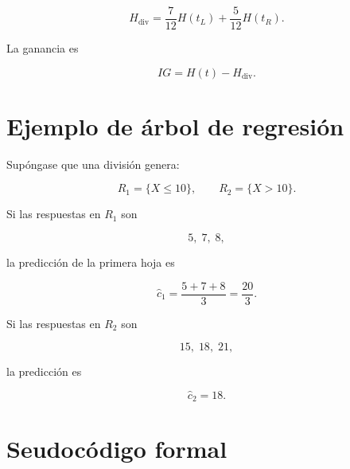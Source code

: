 \documentclass[
  spanish,
  10.5pt,
  letterpaper,
  DIV=11,
  numbers=noendperiod,
  oneside,
  open=any]{scrreprt}
\theoremstyle{definition}
\theoremstyle{definition}
\theoremstyle{plain}
\theoremstyle{remark}
\begin{document}
\[
H_{\text{div}}
=
\frac{7}{12}H(t_L)
+
\frac{5}{12}H(t_R).
\]

La ganancia es

\[
IG=H(t)-H_{\text{div}}.
\]

\section*{Ejemplo de árbol de
regresión}\label{ejemplo-de-uxe1rbol-de-regresiuxf3n}


Supóngase que una división genera:

\[
R_1=\{X\leq 10\},
\qquad
R_2=\{X>10\}.
\]

Si las respuestas en \(R_1\) son

\[
5,\;7,\;8,
\]

la predicción de la primera hoja es

\[
\widehat{c}_1
=
\frac{5+7+8}{3}
=
\frac{20}{3}.
\]

Si las respuestas en \(R_2\) son

\[
15,\;18,\;21,
\]

la predicción es

\[
\widehat{c}_2=18.
\]

\section*{Seudocódigo formal}\label{seudocuxf3digo-formal-4}

\end{document}
